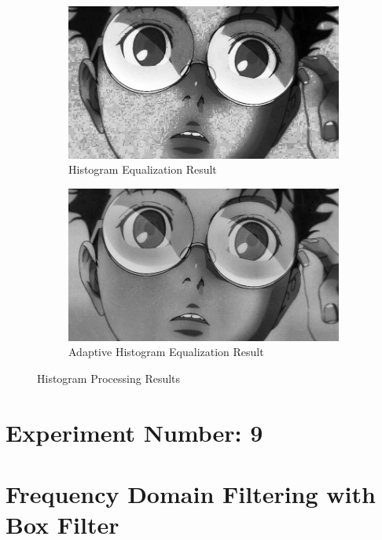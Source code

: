 \documentclass[12pt,a4paper]{article}
\begin{document}
\begin{figure}[H]
  \centering
  \begin{subfigure}[b]{0.8\textwidth}
    \centering
    \includegraphics[width=\textwidth]{histogram/histogram_equalized.jpg}
    \caption{Histogram Equalization Result}
  \end{subfigure}
  \vspace{1em}
  \begin{subfigure}[b]{0.8\textwidth}
    \centering
    \includegraphics[width=\textwidth]{histogram/adaptive_hist_clip2_grid8x8.jpg}
    \caption{Adaptive Histogram Equalization Result}
  \end{subfigure}
  \caption{Histogram Processing Results}
  \label{fig:histogram}
\end{figure}

\newpage
\section*{Experiment Number: 9}
\section{Frequency Domain Filtering with Box Filter}
\end{document}
